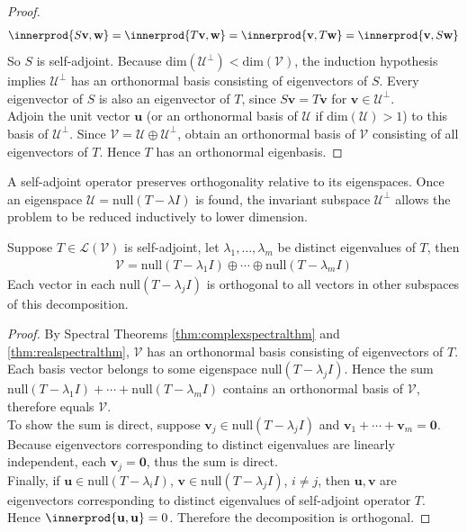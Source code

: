 \begin{theorem}
\begin{proof}
\begin{align}
\innerprod{S \mathbf{v}, \mathbf{w}} = \innerprod{T \mathbf{v}, \mathbf{w}} = \innerprod{\mathbf{v}, T \mathbf{w}} = \innerprod{\mathbf{v}, S \mathbf{w}} \nonumber
\end{align}
So $S$ is self-adjoint. Because $\text{dim}(\mathcal{U}^{\perp}) < \text{dim}(\mathcal{V})$, the induction hypothesis implies $\mathcal{U}^{\perp}$ has an orthonormal basis consisting of eigenvectors of $S$. Every eigenvector of $S$ is also an eigenvector of $T$, since $S \mathbf{v} = T \mathbf{v}$ for $\mathbf{v} \in \mathcal{U}^{\perp}$.\\
Adjoin the unit vector $\mathbf{u}$ (or an orthonormal basis of $\mathcal{U}$ if $\text{dim}(\mathcal{U}) > 1$) to this basis of $\mathcal{U}^{\perp}$. Since $\mathcal{V} = \mathcal{U} \oplus \mathcal{U}^{\perp}$, obtain an orthonormal basis of $\mathcal{V}$ consisting of all eigenvectors of $T$. Hence $T$ has an orthonormal eigenbasis.
\end{proof}
\end{theorem}

A self-adjoint operator preserves orthogonality relative to its eigenspaces. Once an eigenspace $\mathcal{U} = \text{null}(T - \lambda I)$ is found, the invariant subspace $\mathcal{U}^{\perp}$ allows the problem to be reduced inductively to lower dimension.

\begin{corollary} \label{cor:selfadjeigenortho} Suppose $T \in \mathcal{L}(\mathcal{V})$ is self-adjoint, let $\lambda_1, \ldots, \lambda_m$ be distinct eigenvalues of $T$, then
\begin{align}
\mathcal{V} = \text{null}(T - \lambda_1 I) \oplus \cdots \oplus \text{null}(T - \lambda_m I) \nonumber
\end{align}
Each vector in each $\text{null}(T - \lambda_j I)$ is orthogonal to all vectors in other subspaces of this decomposition.
\begin{proof} By Spectral Theorems \ref{thm:complexspectralthm} and \ref{thm:realspectralthm}, $\mathcal{V}$ has an orthonormal basis consisting of eigenvectors of $T$. Each basis vector belongs to some eigenspace $\text{null}(T - \lambda_j I)$. Hence the sum $\text{null}(T - \lambda_1 I) + \cdots + \text{null}(T - \lambda_m I)$ contains an orthonormal basis of $\mathcal{V}$, therefore equals $\mathcal{V}$.\\
To show the sum is direct, suppose $\mathbf{v}_j \in \text{null}(T - \lambda_j I)$ and $\mathbf{v}_1 + \cdots + \mathbf{v}_m = \mathbf{0}$. Because eigenvectors corresponding to distinct eigenvalues are linearly independent, each $\mathbf{v}_j = \mathbf{0}$, thus the sum is direct.\\
Finally, if $\mathbf{u} \in \text{null}(T - \lambda_i I)$, $\mathbf{v} \in \text{null}(T - \lambda_j I)$, $i \neq j$, then $\mathbf{u}, \mathbf{v}$ are eigenvectors corresponding to distinct eigenvalues of self-adjoint operator $T$. Hence $\innerprod{\mathbf{u}, \mathbf{u}} = 0$. Therefore the decomposition is orthogonal.
\end{proof}
\end{corollary}

